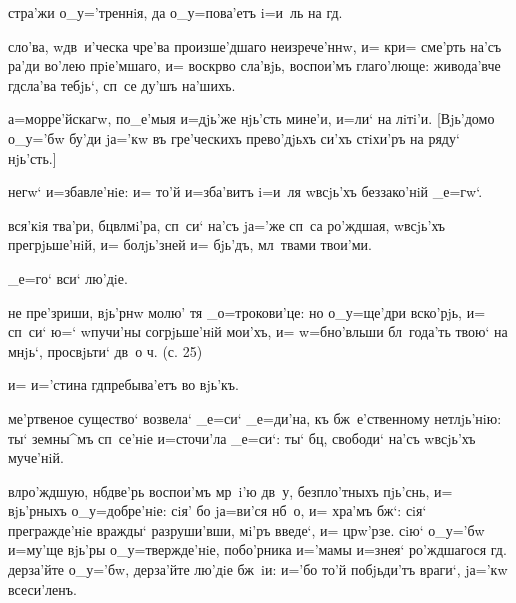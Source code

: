стра'жи о_у='треннiя, да о_у=пова'етъ i=и~ль на гд.

сло'ва, w\т дв~и'ческа чре'ва произше'дшаго неизрече'ннw, 
и= кр и= сме'рть на'съ ра'ди во'лею прiе'мшаго, и= 
воскр во сла'вjь, воспои'мъ глаго'люще: живода'вче 
гд сла'ва тебjь`, сп~се ду'шъ на'шихъ.

а=морре'йскагw, по_е'мыя и=дjь'же нjь'сть мине'и, и=ли` 
на лiтi'и. [Вjь'домо о_у='бw бу'ди jа='кw въ гре'ческихъ 
прево'дjьхъ си'хъ стiхи'ръ на ряду` нjь'сть.]%


негw` и=збавле'нiе: и= то'й и=зба'витъ i=и~ля w\т всjь'хъ 
беззако'нiй _е=гw`.

вся'кiя тва'ри, бц вл мi'ра, сп~си` на'съ jа='же 
сп~са ро'ждшая, w\т всjь'хъ прегрjьше'нiй, и= болjь'зней 
и= бjь'дъ, мл~твами твои'ми.

_е=го` вси` лю'дiе.

не пре'зриши, вjь'рнw молю' тя _о=трокови'це: но 
о_у=ще'дри вско'рjь, и= сп~си` ю=` w\т пучи'ны 
согрjьше'нiй мои'хъ, и= w=бно'вльши бл~года'ть твою` на 
мнjь`, просвjьти` дв~о ч. (с. 25)

и= и='стина гд пребыва'етъ во вjь'къ.

ме'ртвеное существо` возвела` _е=си` _е=ди'на, къ 
бж~е'ственному нетлjь'нiю: ты` земны^мъ сп~се'нiе 
и=сточи'ла _е=си`: ты` бц, свободи` на'съ w\т всjь'хъ 
муче'нiй.


вл ро'ждшую, нб две'рь воспои'мъ мр~i'ю дв~у, 
безпло'тныхъ пjь'снь, и= вjь'рныхъ о_у=добре'нiе: сiя' бо 
jа=ви'ся нб~о, и= хра'мъ бж`: сiя` прегражде'нiе 
вражды` разруши'вши, мi'ръ введе`, и= цр w'рзе. 
сiю` о_у='бw и=му'ще вjь'ры о_у=твержде'нiе, побо'рника 
и='мамы и=з\ъ нея` ро'ждшагося гд. дерза'йте о_у='бw, 
дерза'йте лю'дiе бж~iи: и='бо то'й побjьди'тъ враги`, 
jа='кw всеси'ленъ.

